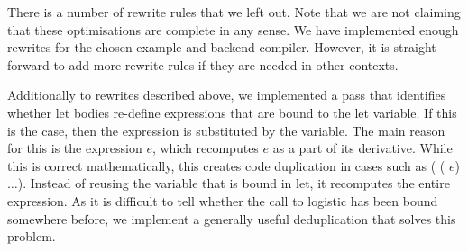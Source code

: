 There is a number of rewrite rules that we left out.  Note that we are
not claiming that these optimisations are complete in any sense.  We have
implemented enough rewrites for the chosen example and backend compiler.
However, it is straight-forward to add more rewrite rules if they are
needed in other contexts.

Additionally to rewrites described above, we implemented a pass that
identifies whether let bodies re-define expressions that are bound to
the let variable.  If this is the case, then the expression is substituted
by the variable.  The main reason for this is the expression  $e$,
which recomputes  $e$ as a part of its derivative.  While
this is correct mathematically, this creates code duplication in cases
such as ( ( $e$) $\dots$).  Instead of reusing
the variable that is bound in let, it recomputes the entire expression.
As it is difficult to tell whether the call to logistic has been bound
somewhere before, we implement a generally useful deduplication that
solves this problem.



